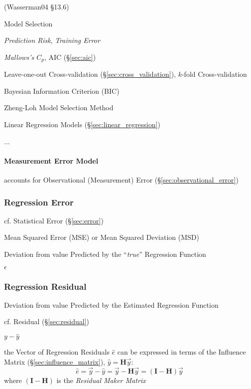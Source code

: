 (Wasserman04 \S13.6)

Model Selection

\emph{Prediction Risk}, \emph{Training Error}

\emph{Mallows's $C_p$}, AIC (\S\ref{sec:aic})

Leave-one-out Cross-validation (\S\ref{sec:cross_validation}),
$k$-fold Cross-validation

Bayesian Information Criterion (BIC) %

Zheng-Loh Model Selection Method

Linear Regression Models (\S\ref{sec:linear_regression})

...



\paragraph{Measurement Error Model}\label{sec:measurement_error_model}\hfill

accounts for Observational (Measurement) Error (\S\ref{sec:observational_error})



\subsubsection{Regression Error}\label{sec:regression_error}

\fist cf. Statistical Error (\S\ref{sec:error})

Mean Squared Error (MSE) or Mean Squared Deviation (MSD)

Deviation from value Predicted by the ``\emph{true}'' Regression Function

$\epsilon$



\subsubsection{Regression Residual}\label{sec:regression_residual}

Deviation from value Predicted by the Estimated Regression Function

\fist cf. Residual (\S\ref{sec:residual})

$y - \hat{y}$

the Vector of Regression Residuals $\hat{e}$ can be expressed in terms of the
Influence Matrix (\S\ref{sec:influence_matrix}), $\hat{y} = \mathbf{H}\vec{y}$:
\[
  \hat{e} = \vec{y} - \hat{y} = \vec{y} - \mathbf{H}\vec{y} =
    (\mathbf{I} - \mathbf{H})\vec{y}
\]
where $(\mathbf{I} - \mathbf{H})$ is the \emph{Residual Maker Matrix}

